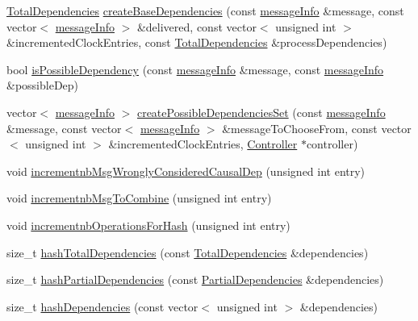 \begin{DoxyCompactItemize}
\item 
\hyperlink{classTotalDependencies}{Total\+Dependencies} \hyperlink{classHashErrorDetector_a09b0d73b3a717ddf850fe644848c15c6}{create\+Base\+Dependencies} (const \hyperlink{structures_8h_a7e7bdc1d2fff8a9436f2f352b2711ed6}{message\+Info} \&message, const vector$<$ \hyperlink{structures_8h_a7e7bdc1d2fff8a9436f2f352b2711ed6}{message\+Info} $>$ \&delivered, const vector$<$ unsigned int $>$ \&incremented\+Clock\+Entries, const \hyperlink{classTotalDependencies}{Total\+Dependencies} \&process\+Dependencies)
\item 
bool \hyperlink{classHashErrorDetector_aaaceeb3d2d27d5f3c85a9b80f959e0fe}{is\+Possible\+Dependency} (const \hyperlink{structures_8h_a7e7bdc1d2fff8a9436f2f352b2711ed6}{message\+Info} \&message, const \hyperlink{structures_8h_a7e7bdc1d2fff8a9436f2f352b2711ed6}{message\+Info} \&possible\+Dep)
\item 
vector$<$ \hyperlink{structures_8h_a7e7bdc1d2fff8a9436f2f352b2711ed6}{message\+Info} $>$ \hyperlink{classHashErrorDetector_ae8605d778886baa20648a9f5955c5943}{create\+Possible\+Dependencies\+Set} (const \hyperlink{structures_8h_a7e7bdc1d2fff8a9436f2f352b2711ed6}{message\+Info} \&message, const vector$<$ \hyperlink{structures_8h_a7e7bdc1d2fff8a9436f2f352b2711ed6}{message\+Info} $>$ \&message\+To\+Choose\+From, const vector$<$ unsigned int $>$ \&incremented\+Clock\+Entries, \hyperlink{classController}{Controller} $\ast$controller)
\item 
void \hyperlink{classHashErrorDetector_a007d537bdfd329c6b23b432b58d4cf4c}{incrementnb\+Msg\+Wrongly\+Considered\+Causal\+Dep} (unsigned int entry)
\item 
void \hyperlink{classHashErrorDetector_a08b4518822a6beff6845da4dd36bfba1}{incrementnb\+Msg\+To\+Combine} (unsigned int entry)
\item 
void \hyperlink{classHashErrorDetector_a6aa56dfbb555e15093bd5d93a683fa42}{incrementnb\+Operations\+For\+Hash} (unsigned int entry)
\item 
size\+\_\+t \hyperlink{classHashErrorDetector_afcad668b4f0ca1c838b40a3c0584c1ee}{hash\+Total\+Dependencies} (const \hyperlink{classTotalDependencies}{Total\+Dependencies} \&dependencies)
\item 
size\+\_\+t \hyperlink{classHashErrorDetector_aed8b0c6d17198a493e5b89f69c2e8713}{hash\+Partial\+Dependencies} (const \hyperlink{classPartialDependencies}{Partial\+Dependencies} \&dependencies)
\item 
size\+\_\+t \hyperlink{classHashErrorDetector_a37d0ee7d8a01b530a03262e4483c53d9}{hash\+Dependencies} (const vector$<$ unsigned int $>$ \&dependencies)

\end{DoxyCompactItemize}
